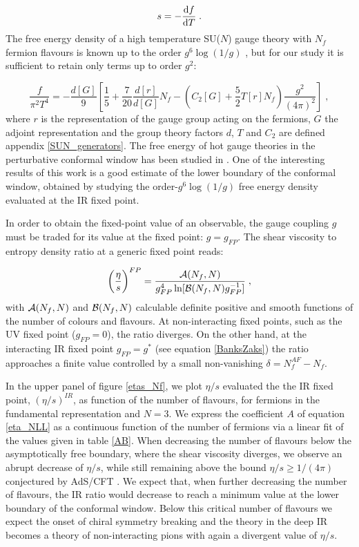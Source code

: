 \begin{equation}
s = - \frac{\mathrm{d} f}{\mathrm{d} T}  \; . 
\end{equation}
%
The free energy density of a high temperature SU($N$) gauge theory with $N_f$ fermion flavours is known up to the order $g^6 \log(1/g)$ \cite{Kajantie:2002wa}, but for our study it is sufficient to retain only terms up to order $g^2$:

\begin{equation}
\frac{f}{\pi^2 T^4 } = - \frac{d[G]}{9} \left[ \frac{1}{5} + \frac{7}{20}\frac{d[r]}{d[G]}N_f 
-   \left ( C_2[G] + \frac{5}{2}T[r] N_f \right ) \frac{g^2}{(4\pi)^2} \right ]\; ,
\end{equation}
%
where $r$ is the representation of the gauge group acting on the fermions, $G$ the adjoint representation and the group theory factors $d$, $T$ and $C_2$ are defined appendix \ref{SUN_generators}.
The free energy of hot gauge theories in the perturbative conformal window has been studied in \cite{Mojaza:2010cm}. One of the interesting results of this work is a good estimate of the lower boundary of the conformal window, obtained by studying the order-$g^6 \log(1/g)$ free energy density evaluated at the IR fixed point.

In order to obtain the fixed-point value of an observable, the gauge coupling $g$ must be traded for its value at the fixed point: $g=g_{FP}$. The shear viscosity to entropy density ratio at a generic fixed point reads:


\begin{equation}
\biggl( \frac{\eta}{s} \biggr)^{FP} = \frac{{\cal A}(N_ f, N) }{g_{FP}^4 \ln[{\cal B}(N_f, N)g_{FP}^{-1}]}  \; , 
\label{etaoversFP}
\end{equation}
%
with $ {\cal A}(N_f, N) $  and $ {\cal B}(N_f, N) $ calculable definite positive and smooth functions of the number of 
colours and flavours.  At non-interacting fixed points,  such as the UV fixed point ($g_{FP} = 0$), the ratio diverges. On the  other hand, at the interacting IR fixed point $g_{FP} = g^*$ (see equation \ref{BanksZaks}) the ratio approaches a finite value controlled by a small non-vanishing $\delta = N_f^{AF} - N_f $. 
 
In the upper panel of figure \ref{etas_Nf}, we plot $\eta/s$ evaluated the the IR fixed point, $(\eta/s)^{IR}$, as function of the number of flavours, for fermions in the fundamental representation and $N = 3$. We express the coefficient $A$ of equation \ref{eta_NLL} as a continuous function of the number of fermions via a linear fit of the values given in table \ref{AB}. When decreasing the number of flavours below the asymptotically free boundary, where the shear viscosity diverges, we observe an abrupt decrease of $\eta/s$, while still remaining above the bound $\eta/s \geq 1/(4\pi)$ conjectured by AdS/CFT \cite{Kovtun:2004de}. We expect that, when further decreasing the number of flavours, the IR ratio would decrease to reach a minimum value at the lower boundary of the conformal window. Below this critical number of flavours we expect the onset of chiral symmetry breaking and the theory in the deep IR becomes a theory of non-interacting pions with again a divergent value of $\eta/s$.

